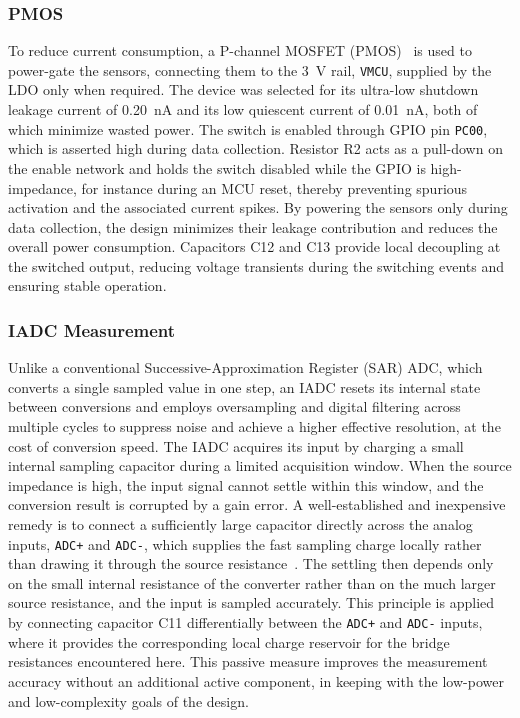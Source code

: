 \subsubsection{PMOS}
To reduce current consumption, a P-channel MOSFET (PMOS)~\cite{PMOS} is used to power-gate the sensors, connecting them to the \SI{3}{\volt} rail, \texttt{VMCU}, supplied by the LDO only when required. The device was selected for its ultra-low shutdown leakage current of \SI{0.20}{\nano\ampere} and its low quiescent current of \SI{0.01}{\nano\ampere}, both of which minimize wasted power. The switch is enabled through GPIO pin \texttt{PC00}, which is asserted high during data collection. Resistor R2 acts as a pull-down on the enable network and holds the switch disabled while the GPIO is high-impedance, for instance during an MCU reset, thereby preventing spurious activation and the associated current spikes. By powering the sensors only during data collection, the design minimizes their leakage contribution and reduces the overall power consumption.
Capacitors C12 and C13 provide local decoupling at the switched output, reducing voltage transients during the switching events and ensuring stable operation.

\subsubsection{IADC Measurement}
Unlike a conventional Successive-Approximation Register (SAR) ADC, which converts a single sampled value in one step, an IADC resets its internal state between conversions and employs oversampling and digital filtering across multiple cycles to suppress noise and achieve a higher effective resolution, at the cost of conversion speed.
The IADC acquires its input by charging a small internal sampling capacitor during a limited acquisition window. When the source impedance is high, the input signal cannot settle within this window, and the conversion result is corrupted by a gain error. A well-established and inexpensive remedy is to connect a sufficiently large capacitor directly across the analog inputs, \texttt{ADC+} and \texttt{ADC-}, which supplies the fast sampling charge locally rather than drawing it through the source resistance~\cite{analog_devices_metering_filters}. The settling then depends only on the small internal resistance of the converter rather than on the much larger source resistance, and the input is sampled accurately.
 This principle is applied by connecting capacitor C11 differentially between the \texttt{ADC+} and \texttt{ADC-} inputs, where it provides the corresponding local charge reservoir for the bridge resistances encountered here. This passive measure improves the measurement accuracy without an additional active component, in keeping with the low-power and low-complexity goals of the design.

